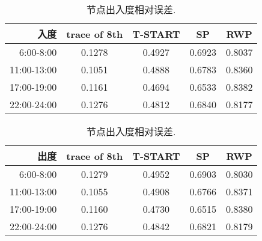 \begin{table}[ht]
\caption{节点出入度相对误差.}\label{table_relative_err}
\centering
\begin{tabular}{r|c|c|c|c}
\hline
	入度 &trace of 8th	&T-START &SP &RWP\\
\hline
 6:00-8:00&
0.1278&	0.4927&	0.6923&	0.8037\\ 
 11:00-13:00&
0.1051&	0.4888&	0.6783&	0.8360\\
 17:00-19:00&
0.1161&	0.4694&	0.6533&	0.8382\\
 22:00-24:00&
0.1276&	0.4812&	0.6840&	0.8177\\
\hline
\end{tabular}

\begin{tabular}{r|c|c|c|c}
\hline
	出度 &trace of 8th	&T-START &SP&RWP\\
\hline
 6:00-8:00&
0.1279&	0.4952&	0.6903&	0.8030\\
 11:00-13:00&
0.1055&	0.4908&	0.6766&	0.8371\\
 17:00-19:00&
0.1160&	0.4730&	0.6515&	0.8380\\
 22:00-24:00&
0.1276&	0.4842&	0.6821&	0.8179\\
\hline
\end{tabular}
\end{table}
